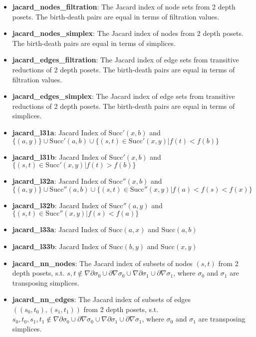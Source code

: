 \documentclass{article}
\begin{document}
\begin{itemize}

    \item \textbf{jacard\_nodes\_filtration}: The Jacard index of node sets from 2 depth posets.
    The birth-death pairs are equal in terms of filtration values.
    
    \item \textbf{jacard\_nodes\_simplex}: The Jacard index of nodes from 2 depth posets.
    The birth-death pairs are equal in terms of simplices.
    
    \item \textbf{jacard\_edges\_filtration}: The Jacard index of edge sets from transitive reductions of 2 depth posets.
    The birth-death pairs are equal in terms of filtration values.
    
    \item \textbf{jacard\_edges\_simplex}: The Jacard index of edge sets from transitive reductions of 2 depth posets.
    The birth-death pairs are equal in terms of simplices.
    
    \item \textbf{jacard\_l31a}: Jacard Index of $\text{Succ}'(x, b)$ and $\{(a, y)\} \cup \text{Succ}'(a, b) \cup \{(s, t)\in \text{Succ}'(x, y) | f(t) < f(b)\}$
    
    \item \textbf{jacard\_l31b}: Jacard Index of $\text{Succ}'(x, b)$ and $\{(s, t)\in \text{Succ}'(x, y) | f(t) > f(b)\}$
    
    \item \textbf{jacard\_l32a}: Jacard Index of $\text{Succ}''(x, b)$ and $\{(a, y)\} \cup \text{Succ}''(a, b) \cup \{(s, t)\in \text{Succ}''(x, y) | f(a) < f(s) < f(x)\}$
    
    \item \textbf{jacard\_l32b}: Jacard Index of $\text{Succ}''(a, y)$ and $\{(s, t)\in \text{Succ}''(x, y) | f(s) < f(a)\}$
    
    \item \textbf{jacard\_l33a}: Jacard Index of $\text{Succ}(a, x)$ and $\text{Succ}(a, b)$
    
    \item \textbf{jacard\_l33b}: Jacard Index of $\text{Succ}(b, y)$ and $\text{Succ}(x, y)$
    
    \item \textbf{jacard\_nn\_nodes}: The Jacard index of subsets of nodes $(s, t)$ from 2 depth posets, s.t. 
    $s, t \notin \nabla\partial\sigma_0 \cup \partial\nabla\sigma_0 \cup \nabla\partial\sigma_1 \cup \partial\nabla\sigma_1$,
    where $\sigma_0$ and $\sigma_1$ are transposing simplices.
    
    \item \textbf{jacard\_nn\_edges}: The Jacard index of subsets of edges $((s_0, t_0), (s_1, t_1))$ from 2 depth posets, s.t. 
    $s_0, t_0, s_1, t_1 \notin \nabla\partial\sigma_0 \cup \partial\nabla\sigma_0 \cup \nabla\partial\sigma_1 \cup \partial\nabla\sigma_1$,
    where $\sigma_0$ and $\sigma_1$ are transposing simplices.
    
\end{itemize}
\end{document}
